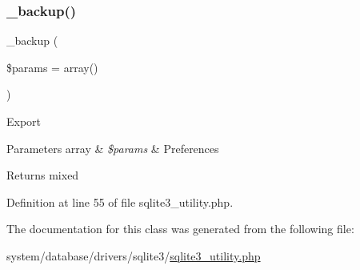 \subsubsection{\texorpdfstring{\_backup()}{\_backup()}}
{\footnotesize\ttfamily \+\_\+backup (\begin{DoxyParamCaption}\item[{}]{\$params = {\ttfamily array()} }\end{DoxyParamCaption})\hspace{0.3cm}{\ttfamily [protected]}}

Export


\begin{DoxyParams}[1]{Parameters}
array & {\em \$params} & Preferences \\
\hline
\end{DoxyParams}
\begin{DoxyReturn}{Returns}
mixed 
\end{DoxyReturn}


Definition at line 55 of file sqlite3\+\_\+utility.\+php.



The documentation for this class was generated from the following file\+:\begin{DoxyCompactItemize}
\item 
system/database/drivers/sqlite3/\mbox{\hyperlink{sqlite3__utility_8php}{sqlite3\+\_\+utility.\+php}}\end{DoxyCompactItemize}
